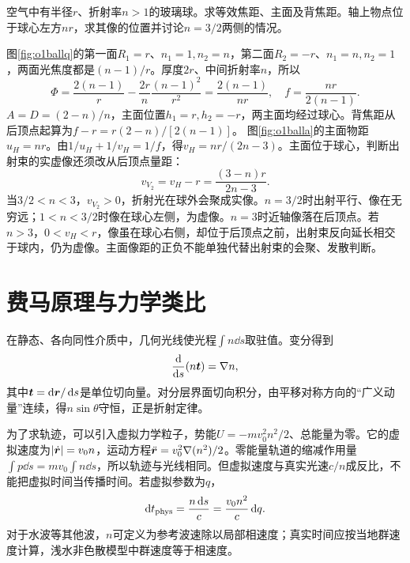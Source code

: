 \begin{example}\label{ex:o1ball}
空气中有半径$r$、折射率$n>1$的玻璃球。求等效焦距、主面及背焦距。轴上物点位于球心左方$nr$，求其像的位置并讨论$n=3/2$两侧的情况。
\end{example}
\begin{solution}
图\ref{fig:o1ballq}的第一面$R_1=r$、$n_1=1,n_2=n$，第二面$R_2=-r$、$n_1=n,n_2=1$，两面光焦度都是$(n-1)/r$。厚度$2r$、中间折射率$n$，所以
\[
 \Phi=\frac{2(n-1)}r-\frac{2r}n\frac{(n-1)^2}{r^2}
 =\frac{2(n-1)}{nr},\quad f=\frac{nr}{2(n-1)}.
\]
$A=D=(2-n)/n$，主面位置$h_1=r,h_2=-r$，两主面均经过球心。背焦距从后顶点起算为$f-r=r(2-n)/[2(n-1)]$。
图\ref{fig:o1balla}的主面物距$u_H=nr$。由$1/u_H+1/v_H=1/f$，得$v_H=nr/(2n-3)$。主面位于球心，判断出射束的实虚像还须改从后顶点量距：
\[
 v_{V_2}=v_H-r=\frac{(3-n)r}{2n-3}.
\]
当$3/2<n<3$，$v_{V_2}>0$，折射光在球外会聚成实像。$n=3/2$时出射平行、像在无穷远；$1<n<3/2$时像在球心左侧，为虚像。$n=3$时近轴像落在后顶点。若$n>3$，$0<v_H<r$，像虽在球心右侧，却位于后顶点之前，出射束反向延长相交于球内，仍为虚像。主面像距的正负不能单独代替出射束的会聚、发散判断。
\end{solution}

\section{费马原理与力学类比}\label{th:o1analogy}
在静态、各向同性介质中，几何光线使光程$\int n\dd s$取驻值。变分得到
\begin{equation}\label{eq:o1ray}
 \frac{\mathop{}\!\mathrm d}{\mathop{}\!\mathrm d s}(n\bm{t})=\nabla n,
\end{equation}
其中$\bm{t}=\mathop{}\!\mathrm d\bm{r}/\mathop{}\!\mathrm d s$是单位切向量。对分层界面切向积分，由平移对称方向的“广义动量”连续，得$n\sin\theta$守恒，正是折射定律。

为了求轨迹，可以引入虚拟力学粒子，势能$U=-mv_0^2n^2/2$、总能量为零。它的虚拟速度为$|\dot{\bm{r}}|=v_0n$，运动方程$\ddot{\bm{r}}=v_0^2\nabla(n^2)/2$。零能量轨道的缩减作用量$\int p\dd s=mv_0\int n\dd s$，所以轨迹与光线相同。但虚拟速度与真实光速$c/n$成反比，不能把虚拟时间当传播时间。若虚拟参数为$q$，
\[
 \mathop{}\!\mathrm d t_{\rm phys}=\frac{n\mathop{}\!\mathrm d s}{c}=
 \frac{v_0n^2}{c}\mathop{}\!\mathrm d q.
\]
对于水波等其他波，$n$可定义为参考波速除以局部相速度；真实时间应按当地群速度计算，浅水非色散模型中群速度等于相速度。

